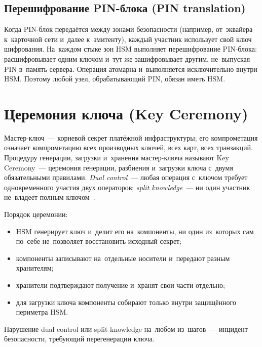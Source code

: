 
\subsection*{Перешифрование PIN-блока (PIN translation)}

Когда PIN-блок передаётся между зонами безопасности (например, от~эквайера
к~карточной сети и~далее к~эмитенту), каждый участник использует свой ключ
шифрования. На~каждом стыке зон HSM выполняет перешифрование PIN-блока:
расшифровывает одним ключом и~тут же зашифровывает другим, не~выпуская PIN
в~память сервера. Операция атомарна и~выполняется исключительно внутри HSM.
Поэтому любой узел, обрабатывающий PIN, обязан иметь HSM.

\FloatBarrier
\section{Церемония ключа (Key Ceremony)}\label{sec:crypto-key-ceremony}

Мастер-ключ~--- корневой секрет платёжной инфраструктуры; его
компрометация означает компрометацию всех производных ключей, всех карт, всех
транзакций. Процедуру генерации, загрузки и~хранения мастер-ключа называют Key
Ceremony~--- церемония генерации, разбиения и~загрузки ключа с~двумя
обязательными правилами. \emph{Dual control}~--- любая операция с~ключом
требует одновременного участия двух операторов; \emph{split knowledge}~--- ни
один участник не~владеет полным ключом~\cite{pci-pin-security}.

Порядок церемонии:

\begin{itemize}
  \item HSM генерирует ключ и~делит его на~компоненты, ни один из~которых сам
    по~себе не~позволяет восстановить исходный секрет;
  \item компоненты записывают на~отдельные носители и~передают разным
    хранителям;
  \item хранители подтверждают получение и~хранят свои части отдельно;
  \item для загрузки ключа компоненты собирают только внутри защищённого
    периметра HSM.
\end{itemize}

Нарушение dual control или split knowledge на~любом из~шагов~--- инцидент
безопасности, требующий перегенерации ключа.

